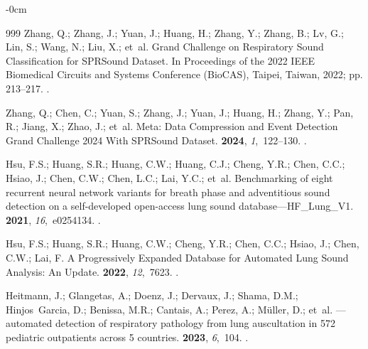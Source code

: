\documentclass[algorithms,article,submit,pdftex,oneauthor]{Definitions/mdpi}
\begin{document}
\begin{adjustwidth}{-\extralength}{0cm}
\begin{thebibliography}{999}
Zhang, Q.; Zhang, J.; Yuan, J.; Huang, H.; Zhang, Y.; Zhang, B.; Lv, G.; Lin,
  S.; Wang, N.; Liu, X.;  et~al.
\newblock Grand Challenge on Respiratory Sound Classification for {SPRSound}
  Dataset.
\newblock In Proceedings of the 2022 IEEE Biomedical Circuits and Systems
  Conference (BioCAS), Taipei, Taiwan,  2022; pp. 213--217.
.

Zhang, Q.; Chen, C.; Yuan, S.; Zhang, J.; Yuan, J.; Huang, H.; Zhang, Y.; Pan,
  R.; Jiang, X.; Zhao, J.;  et~al.
\newblock Meta: Data Compression and Event Detection Grand Challenge 2024 With
  {SPRSound} Dataset.
 {\bf 2024}, {\em 1},~122--130.
.

Hsu, F.S.; Huang, S.R.; Huang, C.W.; Huang, C.J.; Cheng, Y.R.; Chen, C.C.;
  Hsiao, J.; Chen, C.W.; Chen, L.C.; Lai, Y.C.;  et~al.
\newblock Benchmarking of eight recurrent neural network variants for breath
  phase and adventitious sound detection on a self-developed open-access lung
  sound database---{HF\_Lung\_V1}.
 {\bf 2021}, {\em 16},~e0254134.
.

Hsu, F.S.; Huang, S.R.; Huang, C.W.; Cheng, Y.R.; Chen, C.C.; Hsiao, J.; Chen,
  C.W.; Lai, F.
\newblock A Progressively Expanded Database for Automated Lung Sound Analysis:
  An Update.
 {\bf 2022}, {\em 12},~7623.
.

Heitmann, J.; Glangetas, A.; Doenz, J.; Dervaux, J.; Shama, D.M.;
  Hinjos~Garcia, D.; Benissa, M.R.; Cantais, A.; Perez, A.; M{\"u}ller, D.;
  et~al.
---automated detection of respiratory pathology from lung
  auscultation in 572 pediatric outpatients across 5 countries.
 {\bf 2023}, {\em 6},~104.
.


\end{thebibliography}
\end{adjustwidth}
\end{document}
